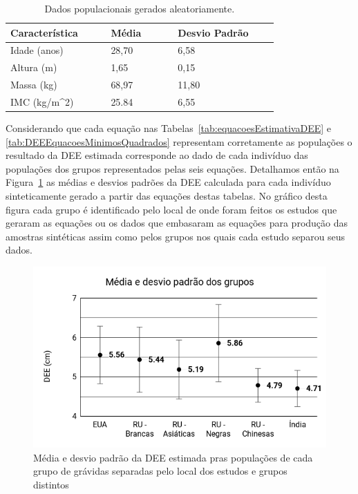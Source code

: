 \begin{table}[!ht]
\begin{center}
\caption{Dados populacionais gerados aleatoriamente.}
\label{tab:DadosPopulacaoGerada}
\begin{tabular}{|p{0.3\linewidth}|p{0.2\linewidth}|p{0.3\linewidth}|}
\hline
\textbf{Característica} & \textbf{Média} & \textbf{Desvio Padrão}\\
\hline\hline
Idade (anos) & 28,70 & 6,58\\
Altura (m) & 1,65 & 0,15\\
Massa (kg) & 68,97 & 11,80\\
IMC (kg/m^2) & 25.84 & 6,55\\
\hline
\end{tabular}
\end{center}
\end{table}

Considerando que cada equação nas Tabelas~\ref{tab:equacoesEstimativaDEE} e \ref{tab:DEEEquacoesMinimosQuadrados} representam corretamente as populações o resultado da \acrshort{DEE} estimada corresponde ao dado de cada indivíduo das populações dos grupos representados pelas seis equações. Detalhamos então na Figura~\ref{fig:mediaDesvioPadraoPopulacoes} as médias e desvios padrões da \acrshort{DEE} calculada para cada indivíduo sinteticamente gerado a partir das equações destas tabelas. No gráfico desta figura cada grupo é identificado pelo local de onde  foram feitos os estudos que geraram as equações ou os dados que embasaram as equações para produção das amostras sintéticas assim como pelos grupos nos quais cada estudo separou seus dados.

\begin{figure}[ht!]
    \centering
    \includegraphics[width=0.9\linewidth]{capitulos/figuras/Media e desvio padrao dos grupos.png} 
    \caption{Média e desvio padrão da \acrshort{DEE} estimada pras populações de cada grupo de grávidas separadas pelo local dos estudos e grupos distintos }
    \label{fig:mediaDesvioPadraoPopulacoes}
\end{figure}

